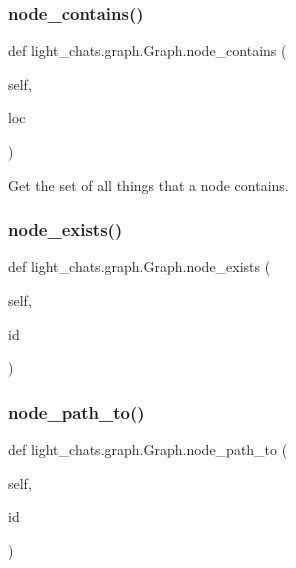 \subsubsection{\texorpdfstring{node\+\_\+contains()}{node\_contains()}}
{\footnotesize\ttfamily def light\+\_\+chats.\+graph.\+Graph.\+node\+\_\+contains (\begin{DoxyParamCaption}\item[{}]{self,  }\item[{}]{loc }\end{DoxyParamCaption})}

\begin{DoxyVerb}Get the set of all things that a node contains.
\end{DoxyVerb}
 \mbox{\label{classlight__chats_1_1graph_1_1Graph_ab0dd6685d8eb353d76eca8de20a39914}} 
\subsubsection{\texorpdfstring{node\+\_\+exists()}{node\_exists()}}
{\footnotesize\ttfamily def light\+\_\+chats.\+graph.\+Graph.\+node\+\_\+exists (\begin{DoxyParamCaption}\item[{}]{self,  }\item[{}]{id }\end{DoxyParamCaption})}

\mbox{\label{classlight__chats_1_1graph_1_1Graph_a20da62a3d5411d93fe820accdd06fa33}} 
\subsubsection{\texorpdfstring{node\+\_\+path\+\_\+to()}{node\_path\_to()}}
{\footnotesize\ttfamily def light\+\_\+chats.\+graph.\+Graph.\+node\+\_\+path\+\_\+to (\begin{DoxyParamCaption}\item[{}]{self,  }\item[{}]{id }\end{DoxyParamCaption})}

